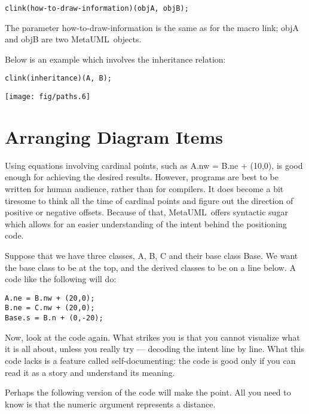 \documentclass{article}
\newcommand{\code}{\ttfamily}
\newcommand{\metauml}{MetaUML}
\begin{document}
\begin{verbatim}
clink(how-to-draw-information)(objA, objB);
\end{verbatim}

The parameter {\code how-to-draw-information} is the same as for the macro {\code link};
{\code objA} and {\code objB} are two \metauml\ objects.

Below is an example which involves the inheritance relation:

\begin{multicols}{2}
\begin{verbatim}
clink(inheritance)(A, B);
\end{verbatim}
\columnbreak
\hspace{1cm}\texttt{[image: fig/paths.6]}
\end{multicols}

\section{Arranging Diagram Items}
\label{section:positioning}

Using equations involving cardinal points, such as {\code A.nw = B.ne + (10,0)}, is
good enough for achieving the desired results. However, programs are best to
be written for human audience, rather than for compilers. It does become a bit
tiresome to think all the time of cardinal points and figure out the
direction of positive or negative offsets. Because of that, \metauml\ offers
syntactic sugar which allows for an easier understanding of the intent behind
the positioning code.

Suppose that we have three classes, {\code A}, {\code B}, {\code C} and their base class
{\code Base}. We want the base class to be at the top, and the derived classes to be
on a line below. A code like the following will do:

\begin{verbatim}
A.ne = B.nw + (20,0);
B.ne = C.nw + (20,0);
Base.s = B.n + (0,-20);
\end{verbatim}

Now, look at the code again. What strikes you is that you cannot visualize what it is all about, unless you really try --- decoding the intent line by line. What this code lacks is a feature called self-documenting: the code is good only if you can read it as a story and understand its meaning.

Perhaps the following version of the code will make the point. All you need to know is that the numeric argument represents a distance.
\end{document}
